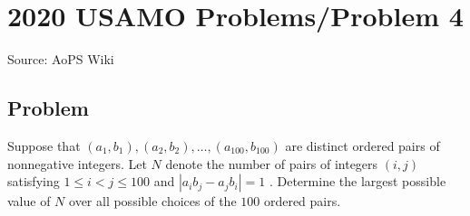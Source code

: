 \documentclass[12pt]{article}
\begin{document}
\section*{{2020 USAMO Problems/Problem 4}}
Source: AoPS Wiki

\subsection*{Problem}
Suppose that $(a_1, b_1), (a_2, b_2), \ldots , (a_{100}, b_{100})$ are distinct ordered pairs of nonnegative integers. Let $N$ denote the number of pairs of integers $(i, j)$ satisfying $1 \le i < j \le 100$ and $|a_ib_j - a_j b_i|=1$ . Determine the largest possible value of $N$ over all possible choices of the $100$ ordered pairs.
\end{document}
